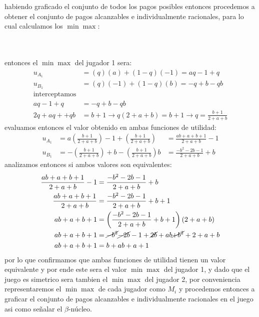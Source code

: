 \documentclass[11pt]{article}
\begin{document}
\begin{example}
\begin{flushleft}
\begin{minipage}{0.5\textwidth}
    \end{minipage}
    \begin{minipage}{0.4\textwidth}
            habiendo graficado el conjunto de todos los pagos posibles entonces procedemos a obtener el conjunto de pagos alcanzables e individualmente racionales, para lo cual calculamos los $\min\max$:
    \end{minipage}

    ~\\~\\entonces el $\min\max$ del jugador 1 sera:
    \begin{align*}
        u_{A_1}&=(q)(a)+(1-q)(-1) = aq-1+q\\
        u_{B_1}&=(q)(-1)+(1-q)(b) = -q+b-qb\\
        \text{interceptamos}\\
        aq-1+q&=-q+b-qb\\
        2q+aq++qb&=b+1\to q(2+a+b)=b+1 \to q = \frac{b+1}{2+a+b}
    \end{align*}
    evaluamos entonces el valor obtenido en ambas funciones de utilidad:
    \begin{align*}
        u_{A_1}&= a\left(\frac{b+1}{2+a+b}\right)-1+\left(\frac{b+1}{2+a+b}\right)&=\frac{ab+a+b+1}{2+a+b}-1\\
        u_{B_1}&= -\left(\frac{b+1}{2+a+b}\right)+b-\left(\frac{b+1}{2+a+b}\right)b&=\frac{-b^{2}-2b-1}{2+a+b}+b
    \end{align*}
    analizamos entonces si ambos valores son equivalentes:
    \begin{align*}
        \frac{ab+a+b+1}{2+a+b}-1&=\frac{-b^{2}-2b-1}{2+a+b}+b\\
        \frac{ab+a+b+1}{2+a+b}&=\frac{-b^{2}-2b-1}{2+a+b}+b+1\\
        ab+a+b+1&=\left(\frac{-b^{2}-2b-1}{2+a+b}+b+1\right)(2+a+b)\\
        ab+a+b+1&=\cancel{-b^{2}}\cancel{-2b}-1+\cancel{2b}+ab\cancel{+b^{2}}+2+a+b\\
        ab+a+b+1&=b+ab+a+1
    \end{align*}
    por lo que confirmamos que ambas funciones de utilidad tienen un valor equivalente y por ende este sera el valor $\min\max$ del jugador 1, y dado que el juego es simetrico sera tambien el $\min\max$ del jugador 2, por conveniencia representaremos el $\min\max$ de cada jugador como $M_i$ y procedemos entonces a graficar el conjunto de pagos alcanzables e individualmente racionales en el juego asi como señalar el $\beta$-núcleo.


\end{flushleft}
\end{example}
\end{document}
